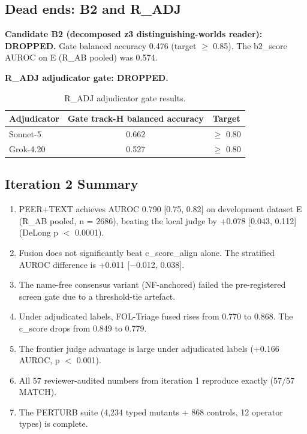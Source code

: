 \documentclass[11pt,letterpaper]{article}
\begin{document}
\subsection{Dead ends: B2 and R\_ADJ}

\textbf{Candidate B2 (decomposed z3 distinguishing-worlds reader): DROPPED.} Gate balanced accuracy 0.476 (target $\geq$ 0.85). The b2\_score AUROC on E (R\_AB pooled) was 0.574.

\textbf{R\_ADJ adjudicator gate: DROPPED.}

\begin{table}[!htbp]
\centering
\caption{R\_ADJ adjudicator gate results.}
\label{tab:radj_gate}
\begin{tabular}{lcc}
\toprule
Adjudicator & Gate track-H balanced accuracy & Target \\
\midrule
Sonnet-5 & 0.662 & $\geq$ 0.80 \\
Grok-4.20 & 0.527 & $\geq$ 0.80 \\
\bottomrule
\end{tabular}
\end{table}

\subsection{Iteration 2 Summary}

\begin{enumerate}
\item PEER+TEXT achieves AUROC 0.790 [0.75, 0.82] on development dataset E (R\_AB pooled, n = 2686), beating the local judge by +0.078 [0.043, 0.112] (DeLong p $<$ 0.0001).
\item Fusion does not significantly beat c\_score\_align alone. The stratified AUROC difference is +0.011 [$-$0.012, 0.038].
\item The name-free consensus variant (NF-anchored) failed the pre-registered screen gate due to a threshold-tie artefact.
\item Under adjudicated labels, FOL-Triage fused rises from 0.770 to 0.868. The c\_score drops from 0.849 to 0.779.
\item The frontier judge advantage is large under adjudicated labels (+0.166 AUROC, p $<$ 0.001).
\item All 57 reviewer-audited numbers from iteration 1 reproduce exactly (57/57 MATCH).
\item The PERTURB suite (4,234 typed mutants + 868 controls, 12 operator types) is complete.
\end{enumerate}
\end{document}

